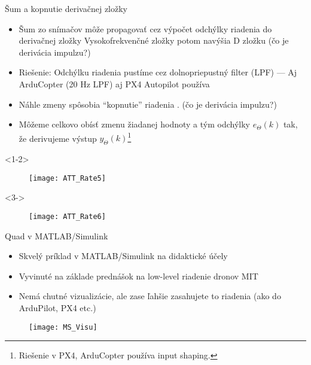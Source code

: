 \begin{frame}[t]{Šum a kopnutie derivačnej zložky}
  \begin{itemize}
    \item<1-2> Šum zo snímačov môže propagovať cez výpočet odchýlky riadenia do derivačnej zložky Vysokofrekvenčné zložky potom navýšia D zložku (čo je derivácia impulzu?)
    \item<2> Riešenie: Odchýlku riadenia pustíme cez dolnopriepustný  filter (LPF) --- Aj ArduCopter (20 Hz LPF) aj PX4 Autopilot používa \citep{AP:PID,PX4:PID}
    \item<3-> Náhle zmeny spôsobia ``kopnutie'' riadenia . (čo je derivácia impulzu?)
    \item<4-> Môžeme celkovo obísť zmenu žiadanej hodnoty a tým odchýlky  $e_\Theta(k)$ tak, že derivujeme výstup $y_\Theta(k)$\footnote{Riešenie v PX4, ArduCopter používa input shaping.}
  \end{itemize}
      \begin{onlyenv}<1-2>
  \begin{figure}
\centering
  \texttt{[image: ATT\_Rate5]}\\
\end{figure}
\end{onlyenv}

\begin{onlyenv}<3->
  \begin{figure}
\centering
  \texttt{[image: ATT\_Rate6]}\\
\end{figure}
\end{onlyenv}
\end{frame}



\begin{frame}{Quad v MATLAB/Simulink}
\begin{itemize}
\item<1-> Skvelý príklad v MATLAB/Simulink na didaktické účely
\item<2-> Vyvinuté na základe prednášok na low-level riadenie dronov MIT \citep{Riether2016}
\item<3-> Nemá chutné vizualizácie, ale zase ľahšie zasahujete to riadenia (ako do ArduPilot, PX4 etc.)
\end{itemize}
  \begin{figure}
\centering
  \texttt{[image: MS\_Visu]}\\
\end{figure}
\end{frame}

